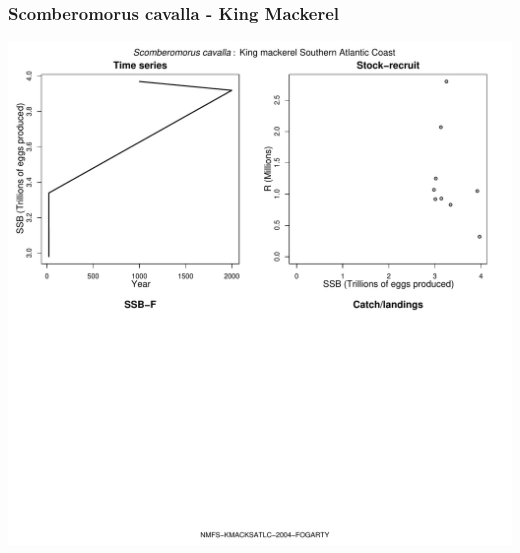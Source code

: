 \subsubsection{Scomberomorus cavalla - King Mackerel}
\begin{center}
\includegraphics[width=1.2\textwidth]{../R/figures/NMFS-KMACKSATLC-2004-FOGARTY.pdf}
\end{center}

